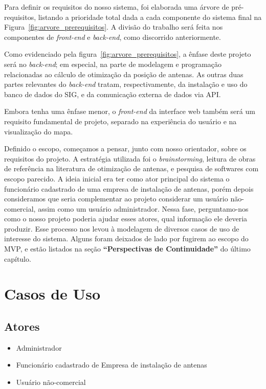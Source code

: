 \documentclass[]{politex}
\begin{document}
Para definir os requisitos do nosso sistema, foi elaborada uma árvore de
pré-requisitos, listando a prioridade total dada a cada componente do sistema
final na Figura~\ref{fig:arvore_prerequisitos}. A divisão do trabalho será
feita nos componentes de \textit{front-end} e \textit{back-end}, como discorrido
anteriormente.

Como evidenciado pela figura~\ref{fig:arvore_prerequisitos}, a ênfase deste projeto será no \textit{back-end};
em especial, na parte de modelagem e programação relacionadas ao cálculo de
otimização da posição de antenas. As outras duas partes relevantes do
\textit{back-end} tratam, respectivamente, da instalação e uso do banco de dados do SIG, e
da comunicação externa de dados via API.

Embora tenha uma ênfase menor, o \textit{front-end} da interface web também será
um requisito fundamental de projeto, separado na experiência do usuário e na
visualização do mapa.

Definido o escopo, começamos a pensar, junto com nosso orientador, sobre os
requisitos do projeto. A estratégia utilizada foi o \textit{brainstorming}, leitura de
obras de referência na literatura de otimização de antenas, e pesquisa de softwares com escopo parecido.
A ideia inicial era ter como ator principal do sistema o funcionário cadastrado
de uma empresa de instalação de antenas, porém depois consideramos que seria
complementar ao projeto considerar um usuário não-comercial, assim
como um usuário administrador. Nessa fase, perguntamo-nos como o nosso projeto
poderia ajudar esses atores, qual informação ele deveria produzir. Esse processo
nos levou à modelagem de diversos casos de uso de interesse do sistema. Alguns
foram deixados de lado por fugirem ao escopo do MVP, e estão listados na seção
\textbf{``Perspectivas de Continuidade''} do último capítulo.

\section{Casos de Uso}
\subsection{Atores}
\begin{itemize}
\item Administrador
\item Funcionário cadastrado de Empresa de instalação de antenas
\item Usuário não-comercial
\end{itemize}
\end{document}
